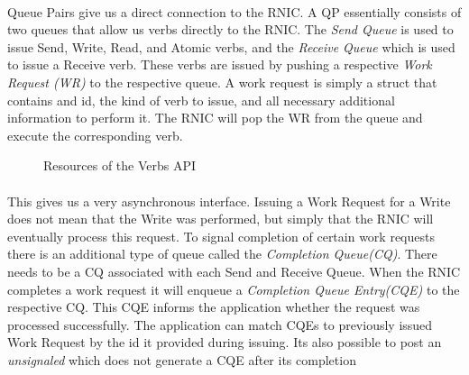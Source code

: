 \paragraph{} Queue Pairs give us a direct connection to the RNIC. A QP essentially consists of two queues that allow us
verbs directly to the RNIC. The \emph{Send Queue} is used to issue Send, Write, Read, and Atomic verbs, and the 
\emph{Receive Queue} which is used to issue a Receive verb. These verbs are issued by pushing a respective \emph{Work Request (WR)}
to the respective queue. A work request is simply a struct that contains and id, the kind of verb to issue, and all necessary 
additional information to perform it. The RNIC will pop the WR from the queue and execute the corresponding verb.

\begin{figure}[!ht]
\begin{center}
\end{center}
\caption{Resources of the Verbs API}
\label{fig:rdma-parts}
\end{figure}


\paragraph{} This gives us a very asynchronous interface. Issuing a Work Request for a Write does not mean that the Write was
performed, but simply that the RNIC will eventually process this request. To signal completion of certain work requests there
is an additional type of queue called the \emph{Completion Queue(CQ)}. There needs to be a CQ associated with each Send and 
Receive Queue. When the RNIC completes a work request it will enqueue a \emph{Completion Queue Entry(CQE)} to the respective
CQ. This CQE informs the application whether the request was processed successfully. The application can match CQEs to 
previously issued Work Request by the id it provided during issuing. Its also possible to post an \emph{unsignaled} which 
does not generate a CQE after its completion


